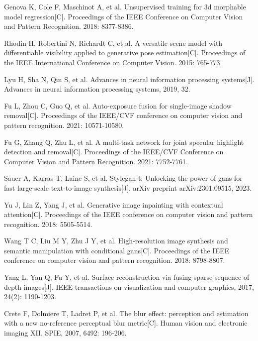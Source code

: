 Genova K, Cole F, Maschinot A, et al. Unsupervised training for 3d morphable model regression[C]. Proceedings of the IEEE Conference on Computer Vision and Pattern Recognition. 2018: 8377-8386.

Rhodin H, Robertini N, Richardt C, et al. A versatile scene model with differentiable visibility applied to generative pose estimation[C]. Proceedings of the IEEE International Conference on Computer Vision. 2015: 765-773.

Lyu H, Sha N, Qin S, et al. Advances in neural information processing systems[J]. Advances in neural information processing systems, 2019, 32.

Fu L, Zhou C, Guo Q, et al. Auto-exposure fusion for single-image shadow removal[C]. Proceedings of the IEEE/CVF conference on computer vision and pattern recognition. 2021: 10571-10580.

Fu G, Zhang Q, Zhu L, et al. A multi-task network for joint specular highlight detection and removal[C]. Proceedings of the IEEE/CVF Conference on Computer Vision and Pattern Recognition. 2021: 7752-7761.

Sauer A, Karras T, Laine S, et al. Stylegan-t: Unlocking the power of gans for fast large-scale text-to-image synthesis[J]. arXiv preprint arXiv:2301.09515, 2023.

Yu J, Lin Z, Yang J, et al. Generative image inpainting with contextual attention[C]. Proceedings of the IEEE conference on computer vision and pattern recognition. 2018: 5505-5514.

Wang T C, Liu M Y, Zhu J Y, et al. High-resolution image synthesis and semantic manipulation with conditional gans[C]. Proceedings of the IEEE conference on computer vision and pattern recognition. 2018: 8798-8807.


Yang L, Yan Q, Fu Y, et al. Surface reconstruction via fusing sparse-sequence of depth images[J]. IEEE transactions on visualization and computer graphics, 2017, 24(2): 1190-1203.



Crete F, Dolmiere T, Ladret P, et al. The blur effect: perception and estimation with a new no-reference perceptual blur metric[C]. Human vision and electronic imaging XII. SPIE, 2007, 6492: 196-206.


